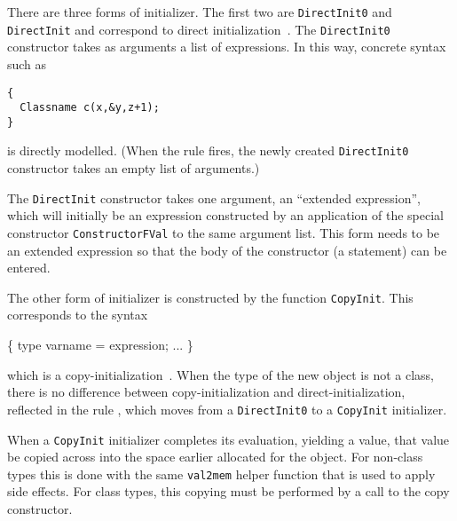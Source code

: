\documentclass[11pt]{article}
\begin{document}
There are three forms of initializer.  The first two are
\texttt{DirectInit0} and \texttt{DirectInit} and correspond to direct
initialization~\cite[\S 8.5 paragraph 12]{cpp-standard-iso14882}.  The
\texttt{DirectInit0} constructor takes as arguments a list of
expressions.  In this way, concrete syntax such as
\begin{verbatim}
{
  Classname c(x,&y,z+1);
}
\end{verbatim}
is directly modelled.  (When the rule  fires,
the newly created \texttt{DirectInit0} constructor takes an empty list
of arguments.)

The \texttt{DirectInit} constructor takes one argument, an ``extended
expression'', which will initially be an expression constructed by an
application of the special constructor \texttt{ConstructorFVal}%
to the same argument list.  This form needs to be an extended
expression so that the body of the constructor (a statement) can be
entered.

The other form of initializer is constructed by the function
\texttt{CopyInit}.  This corresponds to the syntax
\begin{stdrule}
\{
  type varname = expression;
  ...
\}
\end{stdrule}
which is a
copy-initialization~\cite[\emph{ibid}]{cpp-standard-iso14882}.  When
the type of the new object is not a class, there is no difference
between copy-initialization and direct-initialization, reflected in
the rule , which
moves from a \texttt{DirectInit0} to a \texttt{CopyInit} initializer.

When a \texttt{CopyInit} initializer completes its evaluation,
yielding a value, that value be copied across into the space earlier
allocated for the object.  For non-class types this is done with the
same \texttt{val2mem}%
%
helper function that is used to apply side effects.  For class types,
this copying must be performed by a call to the copy constructor.
\end{document}
